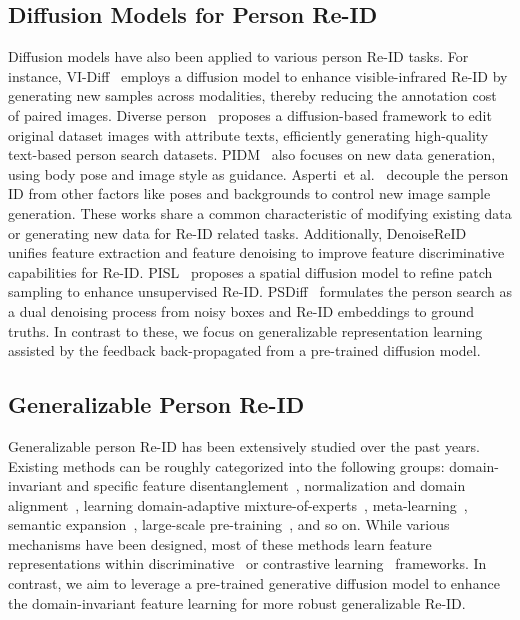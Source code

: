 \subsection{Diffusion Models for Person Re-ID}
Diffusion models have also been applied to various person Re-ID tasks. For instance, VI-Diff~\cite{VI-Diff} employs a diffusion model to enhance visible-infrared Re-ID by generating new samples across modalities, thereby reducing the annotation cost of paired images. Diverse person~\cite{DP} proposes a diffusion-based framework to edit original dataset images with attribute texts, efficiently generating high-quality text-based person search datasets. PIDM~\cite{PIDM} also focuses on new data generation, using body pose and image style as guidance. Asperti~{et al.}~\cite{asperti2024generative} decouple the person ID from other factors like poses and backgrounds to control new image sample generation. These works share a common characteristic of modifying existing data or generating new data for Re-ID related tasks. Additionally, DenoiseReID~\cite{DenoiseReID} unifies feature extraction and feature denoising to improve feature discriminative capabilities for Re-ID. {PISL~\cite{PISL} proposes a spatial diffusion model to refine patch sampling to enhance unsupervised Re-ID. PSDiff~\cite{PSDiff} formulates the person search as a dual denoising process from noisy boxes and Re-ID embeddings to ground truths.} In contrast to these, we focus on generalizable representation learning assisted by the feedback back-propagated from a pre-trained diffusion model.

\subsection{Generalizable Person Re-ID}
Generalizable person Re-ID has been extensively studied over the past years. Existing methods can be roughly categorized into the following groups: domain-invariant and specific feature disentanglement~\cite{SNR,DIR-ReID,ADIN}, normalization and domain alignment~\cite{CBN,MetaBIN,DTIN-Net,GDNorm,META,GN,LDU}, learning domain-adaptive mixture-of-experts~\cite{META,RaMoE,SALDG}, meta-learning~\cite{MetaBIN,M3L,MDA,SuA-SpML}, semantic expansion~\cite{DEX,UDSX}, large-scale pre-training~\cite{ISR,MMET,DMF}, and so on. While various mechanisms have been designed, most of these methods learn feature representations within discriminative~\cite{CBN,SNR} or contrastive learning~\cite{M3L,ISR} frameworks. In contrast, we aim to leverage a pre-trained generative diffusion model to enhance the domain-invariant feature learning for more robust generalizable Re-ID.

